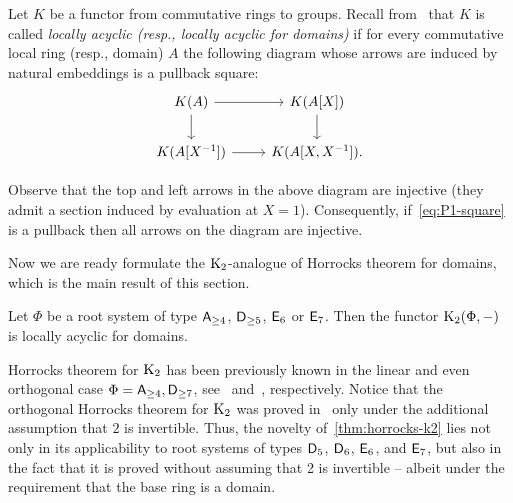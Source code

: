 \begin{dfn}
    Let $K$ be a functor from commutative rings to groups.
    Recall from~\cite{LSV2} that $K$ is called \textit{locally acyclic (resp., locally acyclic for domains)} if for every commutative local ring (resp., domain)
     $A$ the following diagram whose arrows are induced by natural embeddings is a pullback square:
    \begin{equation}\label{eq:P1-square} \begin{tikzcd} K(A) \ar[r] \ar[d] & K(A[X]) \arrow{d} \\ K(A[X\inv]) \ar{r} & K(A[X, X\inv]). \end{tikzcd} \end{equation}
\end{dfn}
Observe that the top and left arrows in the above diagram are injective (they admit a section induced by evaluation at $X=1$).
Consequently, if~\eqref{eq:P1-square} is a pullback then all arrows on the diagram are injective.

Now we are ready formulate the $\operatorname{K}_2$-analogue of Horrocks theorem for domains,
 which is the main result of this section.
\begin{thm}\label{thm:horrocks-k2}
Let $\Phi$ be a root system of type $\mathsf{A}_{\geq 4}$, $\mathsf{D}_{\geq 5}$, $\mathsf{E}_6$ or $\mathsf{E}_7$.
Then the functor $\operatorname{K}_{2}(\Phi, -)$ is locally acyclic for domains.
\end{thm}
Horrocks theorem for $\operatorname{K}_2$ has been previously known in the linear and even orthogonal case $\Phi=\mathsf{A}_{\geq 4},\mathsf{D}_{\geq 7}$, see~\cite[Proposition~4.3]{Tu83} and~\cite[Theorem~1]{LS20}, respectively.
Notice that the orthogonal Horrocks theorem for $\operatorname{K}_2$ was proved in~\cite{LS20} only under the additional assumption that $2$ is invertible.
Thus, the novelty of~\cref{thm:horrocks-k2} lies not only in its applicability to root systems of types $\mathsf{D}_5$, $\mathsf{D}_6$, $\mathsf{E}_6$, and $\mathsf{E}_7$, but also in the fact that
 it is proved without assuming that 2 is invertible -- albeit under the requirement that the base ring is a domain.


